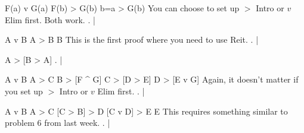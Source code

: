 \argument
 F(a) v G(a)
 F(b) > G(b)
\argumentline
 b=a > G(b)
\endargument
\Hint You can choose to set up $>$ Intro or $v$ Elim first. Both work.
        \answer
        . | 
        \endfitchproof
        \endanswer

\argument
 A v B
 A > B
\argumentline
 B
\endargument
\Hint This is the first proof where you need to use Reit.
        \answer
        . | 
        \endfitchproof
        \endanswer

\argument

\argumentline
 A > [B > A]
\endargument
        \answer\resetfitchsetup
        . | 
        \endfitchproof
        \endanswer

\argument
 A v B
 A > C
 B > [F ^ G]
 C > [D > E]
\argumentline
 D > [E v G]
\endargument
\Hint Again, it doesn't matter if you set up $>$ Intro or $v$ Elim first.
        \answer
        . | 
        \endfitchproof
        \endanswer

\argument
 A v B
 A > C
 [C > B] > D
 [C v D] > E
\argumentline
 E
\endargument
\Hint This requires something similar to problem 6 from last week.
        \answer
        . | 
        \endfitchproof
        \endanswer

\endproblems
\bye
